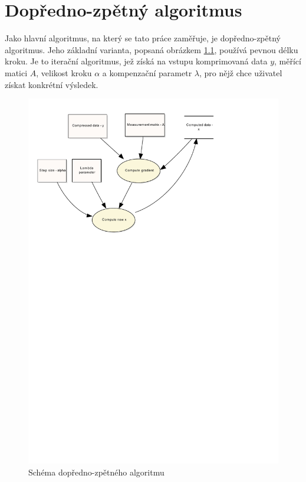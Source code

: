 \documentclass[FM,BP]{tulthesis}
\begin{document}
\chapter{Dopředno-zpětný algoritmus}
\label{ch:fwbw}
Jako hlavní algoritmus, na který se tato práce zaměřuje, je dopředno-zpětný algoritmus. Jeho základní varianta, popsaná obrázkem \ref{fig:fw-bw alg}, používá pevnou délku kroku. Je to iterační algoritmus, jež získá na vstupu komprimovaná data $y$, měřící matici $A$, velikost kroku $\alpha$ a kompenzační parametr $\lambda$, pro nějž chce uživatel získat konkrétní výsledek.
\begin{figure}[!ht]
\begin{center}
\includegraphics[scale=0.85]{obr/forwardbackward.pdf}
\end{center}
\caption{Schéma dopředno-zpětného algoritmu}
\label{fig:fw-bw alg}
\end{figure}
\end{document}
